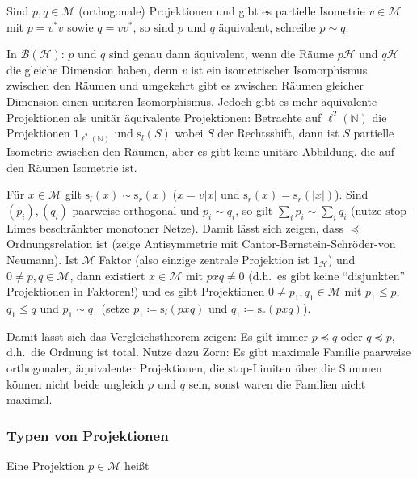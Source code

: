 \documentclass[11pt,a4paper]{scrartcl}
\newcommand{\N}{\mathbb{N}} %
\newcommand{\Hc}{\mathcal{H}}
\newcommand{\B}{\mathcal{B}}
\newcommand{\M}{\mathcal{M}}
\theoremstyle{plain}
\theoremstyle{definition}
\theoremstyle{remark}
\begin{document}
Sind $p,q\in \M$ (orthogonale) Projektionen und gibt es partielle Isometrie $v\in \M$ mit $p=v^*v$ sowie $q=vv^*$, so sind $p$ und $q$ äquivalent, schreibe $p\sim q$. 

In $\B(\Hc)$: $p$ und $q$ sind genau dann äquivalent, wenn die Räume $p\Hc$ und $q\Hc$ die gleiche Dimension haben, denn $v$ ist ein isometrischer Isomorphismus zwischen den Räumen und umgekehrt gibt es zwischen Räumen gleicher Dimension einen unitären Isomorphismus. Jedoch gibt es mehr äquivalente Projektionen als unitär äquivalente Projektionen: Betrachte auf $\ell^2(\N)$ die Projektionen $1_{\ell^2(\N)}$ und $\mathrm{s}_l(S)$ wobei $S$ der Rechtsshift, dann ist $S$ partielle Isometrie zwischen den Räumen, aber es gibt keine unitäre Abbildung, die auf den Räumen Isometrie ist.

Für $x\in \M$ gilt $\mathrm{s}_l(x)\sim \mathrm{s}_r(x)$ ($x=v|x|$ und $\mathrm{s}_r(x)=\mathrm{s}_r(|x|)$). Sind $(p_i),(q_i)$ paarweise orthogonal und $p_i\sim q_i$, so gilt $\sum_i p_i \sim \sum_i q_i$ (nutze $\mathrm{stop}$-Limes beschränkter monotoner Netze). Damit lässt sich zeigen, dass $\preccurlyeq$ Ordnungsrelation ist (zeige Antisymmetrie mit Cantor-Bernstein-Schröder-von Neumann). Ist $\M$ Faktor (also einzige zentrale Projektion ist $1_\Hc$) und $0\neq p,q\in \M$, dann existiert $x\in \M$ mit $pxq\neq 0$ (d.h.\ es gibt keine \enquote{disjunkten} Projektionen in Faktoren!) und es gibt Projektionen $0\neq p_1,q_1\in \M$ mit $p_1\leq p$, $q_1\leq q$ und $p_1\sim q_1$ (setze $p_1\coloneqq \mathrm{s}_l(pxq)$ und $q_1\coloneqq \mathrm{s}_r(pxq)$).

Damit lässt sich das Vergleichstheorem zeigen: Es gilt immer $p\preccurlyeq q$ oder $q\preccurlyeq p$, d.h.\ die Ordnung ist total. Nutze dazu Zorn: Es gibt maximale Familie paarweise orthogonaler, äquivalenter Projektionen, die $\mathrm{stop}$-Limiten über die Summen können nicht beide ungleich $p$ und $q$ sein, sonst waren die Familien nicht maximal.

\subsubsection{Typen von Projektionen}

Eine Projektion $p\in \M$ heißt
\end{document}

